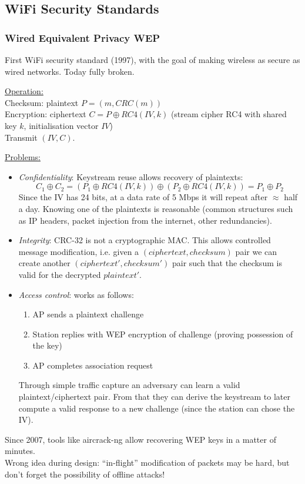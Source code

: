 \subsection{WiFi Security Standards}

\subsubsection*{Wired Equivalent Privacy WEP}

First WiFi security standard (1997), with the goal of making wireless as secure as wired networks.
Today fully broken.

\underline{Operation:}\\
Checksum: plaintext $P = (m, CRC(m))$ \\
Encryption: ciphertext $C = P \oplus RC4(IV, k)$ (stream cipher RC4 with shared key $k$, initialisation vector $IV$) \\
Transmit $(IV, C)$.

\underline{Problems:}
\begin{itemize}
	\item \textit{Confidentiality}:
	Keystream reuse allows recovery of plaintexts:
	$$ C_1 \oplus C_2 = (P_1 \oplus RC4(IV,k)) \oplus (P_2 \oplus RC4(IV,k)) = P_1 \oplus P_2 $$
	Since the IV has 24 bits, at a data rate of 5 Mbps it will repeat after $\approx$ half a day.
	Knowing one of the plaintexts is reasonable (common structures such as IP headers, packet injection from the internet, other redundancies).
	\item \textit{Integrity}: CRC-32 is not a cryptographic MAC.
	This allows controlled message modification, i.e. given a $(ciphertext, checksum)$ pair we can create another $(ciphertext', checksum')$ pair such that the checksum is valid for the decrypted $plaintext'$.
	\item \textit{Access control}: works as follows:
	\begin{enumerate}
		\item AP sends a plaintext challenge
		\item Station replies with WEP encryption of challenge (proving possession of the key)
		\item AP completes association request
	\end{enumerate}
	Through simple traffic capture an adversary can learn a valid plaintext/ciphertext pair.
	From that they can derive the keystream to later compute a valid response to a new challenge (since the station can chose the IV).
\end{itemize}
Since 2007, tools like aircrack-ng allow recovering WEP keys in a matter of minutes.
\\
Wrong idea during design: ``in-flight'' modification of packets may be hard, but don't forget the possibility of offline attacks!


